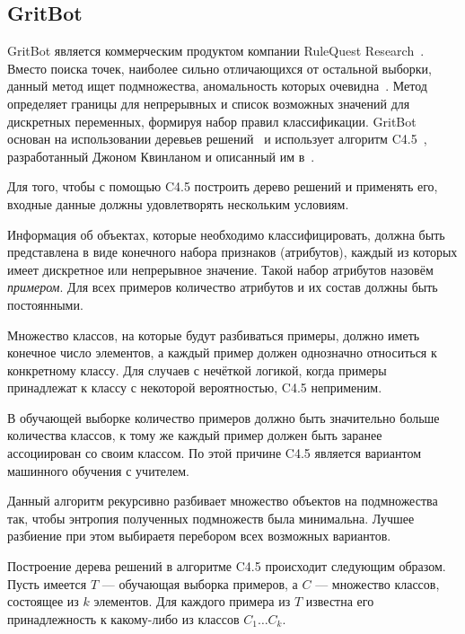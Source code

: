 \subsection{GritBot}
GritBot является коммерческим продуктом компании RuleQuest Research~\cite{GritBotWebPage}. Вместо поиска точек, наиболее сильно отличающихся от остальной выборки, данный метод ищет подмножества, аномальность которых очевидна~\cite{SchwabacherMachLearnAppl}. Метод определяет границы для непрерывных и список возможных значений для дискретных переменных, формируя набор правил классификации. GritBot основан на использовании деревьев решений~\cite{MartinCompUnsupervisedDetectionMethods} и использует алгоритм C4.5~\cite{MLInCyberTrust}, разработанный Джоном Квинланом и описанный им в~\cite{QuinlanC45}.

Для того, чтобы с помощью C4.5 построить дерево решений и применять его, входные данные должны удовлетворять нескольким условиям.

Информация об объектах, которые необходимо классифицировать, должна быть представлена в виде конечного набора признаков (атрибутов), каждый из которых имеет дискретное или непрерывное значение. Такой набор атрибутов назовём \textit{примером}. Для всех примеров количество атрибутов и их состав должны быть постоянными.

Множество классов, на которые будут разбиваться примеры, должно иметь конечное число элементов, а каждый пример должен однозначно относиться к конкретному классу. Для случаев с нечёткой логикой, когда примеры принадлежат к классу с некоторой вероятностью, C4.5 неприменим.

В обучающей выборке количество примеров должно быть значительно больше количества классов, к тому же каждый пример должен быть заранее ассоциирован со своим классом. По этой причине C4.5 является вариантом машинного обучения с учителем.

Данный алгоритм рекурсивно разбивает множество объектов на подмножества так, чтобы энтропия полученных подмножеств была минимальна. Лучшее разбиение при этом выбираетя перебором всех возможных вариантов. 

Построение дерева решений в алгоритме C4.5 происходит следующим образом. Пусть имеется $T$ --- обучающая выборка примеров, а $C$ --- множество классов, состоящее из $k$ элементов. Для каждого примера из $T$ известна его принадлежность к какому-либо из классов $C_1\dots C_k$.

